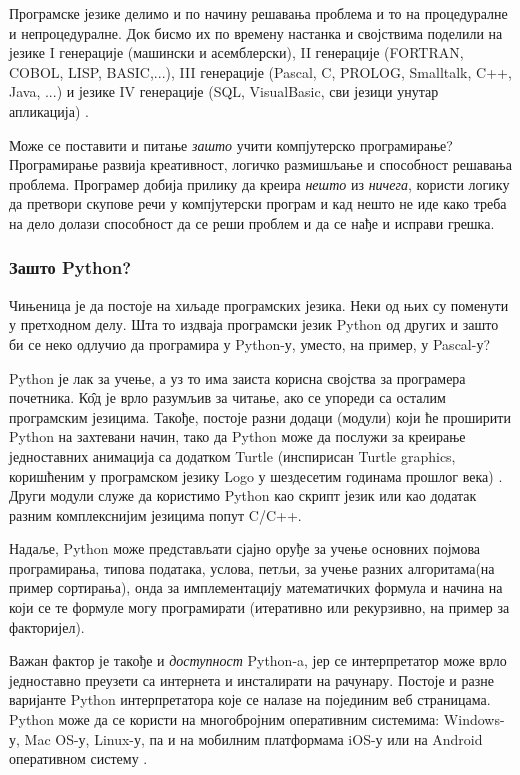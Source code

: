 Програмске језике делимо и по начину решавања проблема и то на процедуралне и непроцедуралне. Док бисмо их по времену настанка и својствима поделили на језике I генерације (машински и асемблерски), II генерације (FORTRAN, COBOL, LISP, BASIC,...), III генерације (Pascal, C, PROLOG, Smalltalk, C++, Java, ...) и језике IV генерације (SQL, VisualBasic, сви језици унутар апликација)  \cite{tosic}.

Може се поставити и питање \emph{зашто} учити компјутерско програмирање? Програмирање развија креативност, логичко размишљање и способност решавања проблема. Програмер добија прилику да креира \emph{нешто} из \emph{ничега}, користи логику да претвори скупове речи у компјутерски програм и кад нешто не иде како треба на дело долази способност да се реши проблем и да се нађе и исправи грешка.

\subsubsection{Зашто Python?}
Чињеница је да постоје на хиљаде програмских језика. Неки од њих су поменути у претходном делу. Шта то издваја програмски језик Python од других и зашто би се неко одлучио да програмира у Python-у, уместо, на пример, у Pascal-у?

Python је лак за учење, а уз то има заиста корисна својства за програмера почетника. К\^{о}д је врло разумљив за читање, ако се упореди са осталим програмским језицима. Такође, постоје разни додаци (модули) који ће проширити Python на захтевани начин, тако да Python може да послужи за креирање једноставних анимација са додатком Turtle (инспирисан Turtle graphics, коришћеним у програмском језику Logo у шездесетим годинама прошлог века) \cite{briggs2012python}. Други модули служе да користимо Python као скрипт језик или као додатак разним комплекснијим језицима попут  C/C++.

Надаље, Python може представљати сјајно оруђе за учење основних појмова програмирања, типова података, услова, петљи, за учење разних алгоритама(на пример сортирања), онда за имплементацију математичких формула и начина на који се те формуле могу програмирати (итеративно или рекурзивно, на пример за факторијел).

Важан фактор је такође и \emph{доступност} Python-a, јер се интерпретатор може врло једноставно преузети са интернета и инсталирати на рачунару. Постоје и разне варијанте Python интерпретатора које се налазе на појединим веб страницама. Python може да се користи на многобројним оперативним системима: Windows-у, Mac OS-у, Linux-у, па и на мобилним платформама iOS-у или на Android оперативном систему  \cite{pythonsite}.

